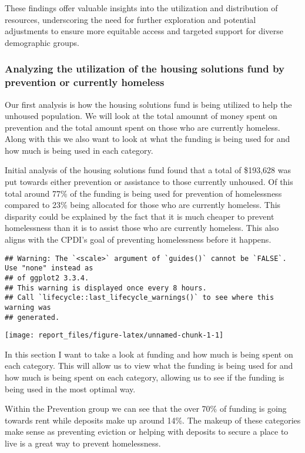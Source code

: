 \documentclass[
]{article}
\begin{document}
These findings offer valuable insights into the utilization and
distribution of resources, underscoring the need for further exploration
and potential adjustments to ensure more equitable access and targeted
support for diverse demographic groups.

\subsubsection{Analyzing the utilization of the housing solutions fund
by prevention or currently
homeless}\label{analyzing-the-utilization-of-the-housing-solutions-fund-by-prevention-or-currently-homeless}

Our first analysis is how the housing solutions fund is being utilized
to help the unhoused population. We will look at the total amounnt of
money spent on prevention and the total amount spent on those who are
currently homeless. Along with this we also want to look at what the
funding is being used for and how much is being used in each category.

Initial analysis of the housing solutions fund found that a total of
\$193,628 was put towards either prevention or assistance to those
currently unhoused. Of this total around 77\% of the funding is being
used for prevention of homelessness compared to 23\% being allocated for
those who are currently homeless. This disparity could be explained by
the fact that it is much cheaper to prevent homelessness than it is to
assist those who are currently homeless. This also aligns with the
CPDI's goal of preventing homelessness before it happens.

\begin{verbatim}
## Warning: The `<scale>` argument of `guides()` cannot be `FALSE`. Use "none" instead as
## of ggplot2 3.3.4.
## This warning is displayed once every 8 hours.
## Call `lifecycle::last_lifecycle_warnings()` to see where this warning was
## generated.
\end{verbatim}

\texttt{[image: report\_files/figure-latex/unnamed-chunk-1-1]}

In this section I want to take a look at funding and how much is being
spent on each category. This will allow us to view what the funding is
being used for and how much is being spent on each category, allowing us
to see if the funding is being used in the most optimal way.

Within the Prevention group we can see that the over 70\% of funding is
going towards rent while deposits make up around 14\%. The makeup of
these categories make sense as preventing eviction or helping with
deposits to secure a place to live is a great way to prevent
homelessness.
\end{document}
